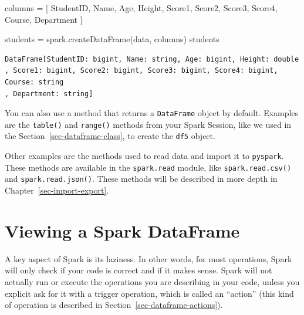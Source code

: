 \documentclass[
  11pt,
  letterpaper,
  DIV=11,
  numbers=noendperiod]{scrreprt}
\newenvironment{Shaded}{\begin{snugshade}}{\end{snugshade}}
\newcommand{\NormalTok}[1]{\textcolor[rgb]{0.00,0.23,0.31}{#1}}
\newcommand{\OperatorTok}[1]{\textcolor[rgb]{0.37,0.37,0.37}{#1}}
\newcommand{\StringTok}[1]{\textcolor[rgb]{0.13,0.47,0.30}{#1}}
\begin{document}
\begin{Shaded}
\begin{Highlighting}[]
\NormalTok{columns }\OperatorTok{=}\NormalTok{ [}
  \StringTok{\textquotesingle{}StudentID\textquotesingle{}}\NormalTok{, }\StringTok{\textquotesingle{}Name\textquotesingle{}}\NormalTok{, }\StringTok{\textquotesingle{}Age\textquotesingle{}}\NormalTok{, }\StringTok{\textquotesingle{}Height\textquotesingle{}}\NormalTok{, }\StringTok{\textquotesingle{}Score1\textquotesingle{}}\NormalTok{,}
  \StringTok{\textquotesingle{}Score2\textquotesingle{}}\NormalTok{, }\StringTok{\textquotesingle{}Score3\textquotesingle{}}\NormalTok{, }\StringTok{\textquotesingle{}Score4\textquotesingle{}}\NormalTok{, }\StringTok{\textquotesingle{}Course\textquotesingle{}}\NormalTok{, }\StringTok{\textquotesingle{}Department\textquotesingle{}}
\NormalTok{]}

\NormalTok{students }\OperatorTok{=}\NormalTok{ spark.createDataFrame(data, columns)}
\NormalTok{students}
\end{Highlighting}
\end{Shaded}

\begin{verbatim}
DataFrame[StudentID: bigint, Name: string, Age: bigint, Height: double
, Score1: bigint, Score2: bigint, Score3: bigint, Score4: bigint, Course: string
, Department: string]
\end{verbatim}

You can also use a method that returns a \texttt{DataFrame} object by
default. Examples are the \texttt{table()} and \texttt{range()} methods
from your Spark Session, like we used in the
Section~\ref{sec-dataframe-class}, to create the \texttt{df5} object.

Other examples are the methods used to read data and import it to
\texttt{pyspark}. These methods are available in the \texttt{spark.read}
module, like \texttt{spark.read.csv()} and \texttt{spark.read.json()}.
These methods will be described in more depth in
Chapter~\ref{sec-import-export}.

\hypertarget{sec-viewing-a-dataframe}{%
\section{Viewing a Spark DataFrame}\label{sec-viewing-a-dataframe}}

A key aspect of Spark is its laziness. In other words, for most
operations, Spark will only check if your code is correct and if it
makes sense. Spark will not actually run or execute the operations you
are describing in your code, unless you explicit ask for it with a
trigger operation, which is called an ``action'' (this kind of operation
is described in Section~\ref{sec-dataframe-actions}).
\end{document}
